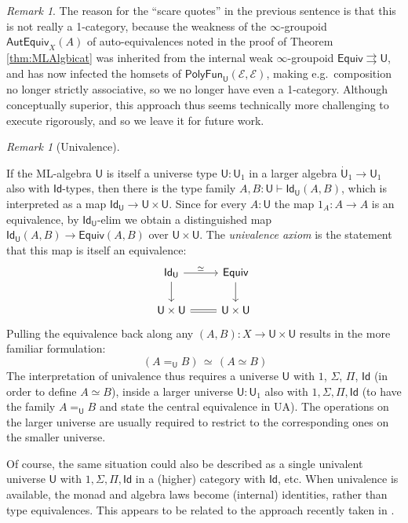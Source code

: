 \documentclass[12pt,reqno]{amsart}
\newcommand{\EE}{\ensuremath{\mathcal{E}}}
\renewcommand{\to}{\ensuremath{\rightarrow}}
\newcommand{\tto}{\ensuremath{\rightrightarrows}}
\newcommand{\Id}{\mathsf{Id}}
\newcommand{\T}{\ensuremath{\mathsf{U}}}
\newcommand{\TT}{\ensuremath{\dot{\mathsf{U}}}}
\theoremstyle{remark}
\newtheorem{remark}[theorem]{Remark}
\theoremstyle{definition}
\begin{document}
\begin{remark}
The reason for the ``scare quotes'' in the previous sentence is that this is not really a 1-category, because the weakness of the $\infty$-groupoid $\mathsf{AutEquiv}_X(A)$ of auto-equivalences noted in the proof of Theorem \ref{thm:MLAlgbicat} was inherited from the internal weak $\infty$-groupoid  $\mathsf{Equiv} \tto \T$, and has now infected the homsets of $\mathsf{PolyFun}_\T(\EE, \EE)$, making e.g.\ composition no longer strictly associative, so we no longer have even a 1-category.  Although conceptually superior, this approach thus seems technically more challenging to execute rigorously, and so we leave it for future work.
\end{remark}

\begin{remark}[Univalence]\label{remark:univalence}

If the ML-algebra $\T$ is itself a universe type $\T : \T_1$ in a larger algebra $\TT_1 \to \T_1$ also with $\Id{}$-types, then there is the type family $A, B: \T \vdash \Id_{\T}(A,B)$, which is interpreted as a map $\Id_{\T}\to \T \times \T$.  Since for every $A:\T$ the map $1_A : A \to A$ is an equivalence, by $\Id_{\T}$-elim we obtain a distinguished map  $\Id_{\T}(A, B) \to \mathsf{Equiv}(A, B)$ over $\T \times \T$.  The \emph{univalence axiom} is the statement that this map is itself an equivalence:
\begin{equation}\label{diag:univalence4}
\begin{tikzcd} 
\Id_{\T} \ar[d] \ar[r, "{\simeq}"] & \mathsf{Equiv} \ar[d] \\  
 \T \times \T  \ar[r, equals] & \T \times \T
	 \end{tikzcd}
 \end{equation}
 Pulling the equivalence back along any $(A, B) : X \to \T \times \T$ results in the more familiar formulation:
 \[\tag{UA}
 \ (A =_\T B) \, \simeq\, (A \simeq B)
 \]
The interpretation of univalence thus requires a universe $\T$ with $1$, $\Sigma$, $\Pi$, $\Id{}$ (in order to define $A\simeq B$), inside a larger universe $\T:\T_1$ also with $1, \Sigma, \Pi, \Id{}$ (to have the family $A =_\T B$ and state the central equivalence in UA). The operations on the larger universe are usually required to restrict to the corresponding ones on the smaller universe.   

Of course, the same situation could also be described as a single univalent universe $\T$ with $1, \Sigma, \Pi, \Id{}$ in a (higher) category with $\Id{}$, etc.  When univalence is available, the monad and algebra laws become (internal) identities, rather than type equivalences.  This appears to be related to the approach recently taken in \cite{AberleSpivak:2024}.
\end{remark}
\end{document}
